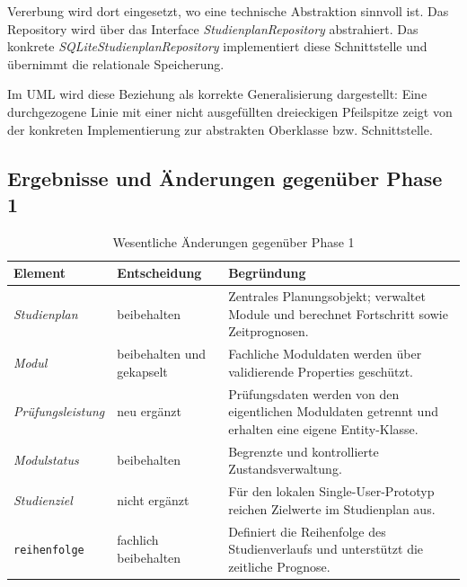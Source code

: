 \documentclass[11pt,a4paper]{article}
\begin{document}
Vererbung wird dort eingesetzt, wo eine technische Abstraktion
sinnvoll ist. Das Repository wird über das Interface
\textit{StudienplanRepository} abstrahiert. Das konkrete
\textit{SQLiteStudienplanRepository} implementiert diese Schnittstelle
und übernimmt die relationale Speicherung.

Im UML wird diese Beziehung als korrekte Generalisierung dargestellt:
Eine durchgezogene Linie mit einer nicht ausgefüllten dreieckigen
Pfeilspitze zeigt von der konkreten Implementierung zur abstrakten
Oberklasse bzw. Schnittstelle.

\subsection{Ergebnisse und Änderungen gegenüber Phase 1}

\begin{table}[H]
    \centering
    \scriptsize
    \caption{Wesentliche Änderungen gegenüber Phase 1}
    \begin{tabularx}{\textwidth}{
        >{\raggedright\arraybackslash}p{2.7cm}
        >{\raggedright\arraybackslash}p{2.8cm}
        >{\raggedright\arraybackslash}X
    }
        \toprule
        \textbf{Element} &
        \textbf{Entscheidung} &
        \textbf{Begründung} \\
        \midrule

        \textit{Studienplan} &
        beibehalten &
        Zentrales Planungsobjekt; verwaltet Module und berechnet
        Fortschritt sowie Zeitprognosen. \\

        \textit{Modul} &
        beibehalten und gekapselt &
        Fachliche Moduldaten werden über validierende Properties
        geschützt. \\

        \textit{Prüfungsleistung} &
        neu ergänzt &
        Prüfungsdaten werden von den eigentlichen Moduldaten getrennt
        und erhalten eine eigene Entity-Klasse. \\

        \textit{Modulstatus} &
        beibehalten &
        Begrenzte und kontrollierte Zustandsverwaltung. \\

        \textit{Studienziel} &
        nicht ergänzt &
        Für den lokalen Single-User-Prototyp reichen Zielwerte im
        Studienplan aus. \\

        \texttt{reihenfolge} &
        fachlich beibehalten &
        Definiert die Reihenfolge des Studienverlaufs und unterstützt
        die zeitliche Prognose. \\

        \bottomrule
    \end{tabularx}
\end{table}
\end{document}
